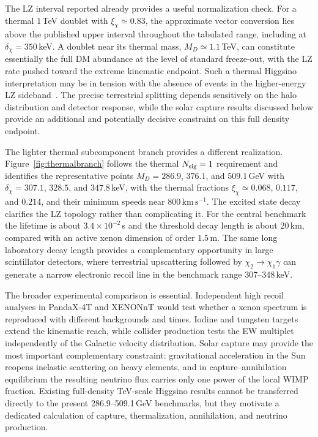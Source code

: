 \documentclass[aps,prd,reprint,preprintnumbers,superscriptaddress,nofootinbib,floatfix]{revtex4-2}
\newcommand{\dchi}{\delta_\chi}
\newcommand{\kms}{\,\mathrm{km\,s^{-1}}}
\begin{document}
The LZ interval reported already provides a useful normalization check. For a thermal $1$\,TeV doublet with $\xi_\chi\simeq0.83$, the approximate vector conversion lies above the published upper interval throughout the tabulated range, including at $\dchi=350$\,keV. A doublet near its thermal mass, $M_D\simeq1.1$\,TeV, can constitute essentially the full DM abundance at the level of standard freeze-out, with the LZ rate pushed toward the extreme kinematic endpoint. Such a thermal Higgsino interpretation may be in tension with the absence of events in the higher-energy LZ sideband~\cite{Rodd:2026tyn}. The precise terrestrial splitting depends sensitively on the halo distribution and detector response, while the solar capture results discussed below provide an additional and potentially decisive constraint on this full density endpoint.

The lighter thermal subcomponent branch provides a different realization. Figure~\ref{fig:thermalbranch} follows the thermal $N_{\rm sig}=1$ requirement and identifies the representative points $M_D=286.9$, $376.1$, and $509.1$\,GeV with $\dchi=307.1$, $328.5$, and $347.8$\,keV, with the thermal fractions $\xi_\chi\simeq0.068$, $0.117$, and $0.214$, and their minimum speeds near $800\kms$. The excited state decay clarifies the LZ topology rather than complicating it. For the central benchmark the lifetime is about $3.4\times10^{-2}$\,s and the threshold decay length is about $20$\,km, compared with an active xenon dimension of order $1.5$\,m. The same long laboratory decay length provides a complementary opportunity in large scintillator detectors, where terrestrial upscattering followed by $\chi_2\to\chi_1\gamma$ can generate a narrow electronic recoil line in the benchmark range 307--348\,keV.

The broader experimental comparison is essential. Independent high recoil analyses in PandaX-4T and XENONnT would test whether a xenon spectrum is reproduced with different backgrounds and times. Iodine and tungsten targets extend the kinematic reach, while collider production tests the EW multiplet independently of the Galactic velocity distribution. Solar capture may provide the most important complementary constraint: gravitational acceleration in the Sun reopens inelastic scattering on heavy elements, and in capture--annihilation equilibrium the resulting neutrino flux carries only one power of the local WIMP fraction. Existing full-density TeV-scale Higgsino results cannot be transferred directly to the present 286.9--509.1\,GeV benchmarks, but they motivate a dedicated calculation of capture, thermalization, annihilation, and neutrino production.
\end{document}
